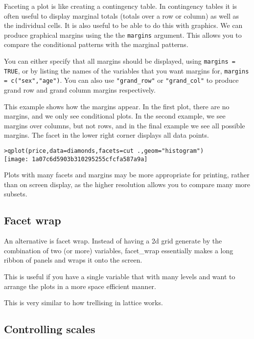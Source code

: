 Faceting a plot is like creating a contingency table.  In contingency tables it is often useful to display marginal totals (totals over a row or column) as well as the individual cells.  It is also useful to be able to do this with graphics.  We can produce graphical margins using the the {\tt margins} argument.  This allows you to compare the conditional patterns with the marginal patterns.

You can either specify that all margins should be displayed, using {\tt margins = TRUE}, or by listing the names of the variables that you want margins for, {\tt margins = c("sex","age")}.  You can also use \verb|"grand_row"| or \verb|"grand_col"| to produce grand row and grand column margins respectively.

This example shows how the margins appear.  In the first plot, there are no margins, and we only see conditional plots.  In the second example, we see margins over columns, but not rows, and in the final example we see all possible margins.  The facet in the lower right corner displays all data points.

\begin{alltt}
> qplot(price, data = diamonds, facets = cut ~ ., geom = "histogram")
\texttt{[image: 1a07c6d5903b310295255cfcfa587a9a]}

\end{alltt}

Plots with many facets and margins may be more appropriate for printing, rather than on screen display, as the higher resolution allows you to compare many more subsets.

\subsection{Facet wrap}
\label{sub:facet_wrap}

An alternative is facet wrap.  Instead of having a 2d grid generate by the combination of two (or more) variables, facet\_wrap essentially makes a long ribbon of panels and wraps it onto the screen.  

This is useful if you have a single variable that with many levels and want to arrange the plots in a more space efficient manner.

This is very similar to how trellising in lattice works.

\subsection{Controlling scales}
\label{sub:controlling_scales}

